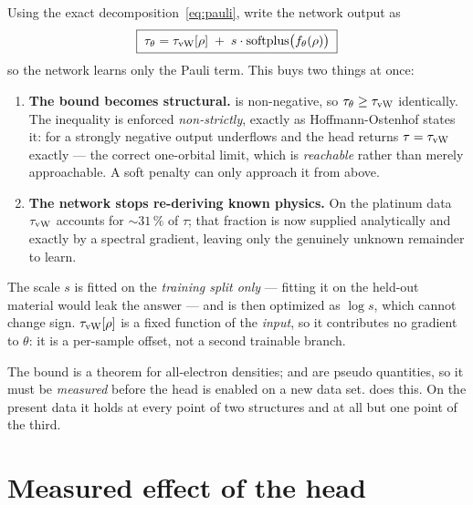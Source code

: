 Using the exact decomposition~\eqref{eq:pauli}, write the network output as
\begin{equation}
  \boxed{\;
    \tau_\theta = \tau_{\mathrm{vW}}[\rho] \;+\; s\cdot\mathrm{softplus}\bigl(f_\theta(\rho)\bigr) \;}
  \label{eq:paulihead}
\end{equation}
so the network learns only the Pauli term. This buys two things at once:

\begin{enumerate}
  \item \textbf{The bound becomes structural.}  is non-negative,
    so $\tau_\theta \ge \tau_{\mathrm{vW}}$ identically. The inequality is enforced
    \emph{non-strictly}, exactly as Hoffmann-Ostenhof states it: for a strongly
    negative output  underflows and the head returns
    $\tau=\tau_{\mathrm{vW}}$ exactly --- the correct one-orbital limit, which is
    \emph{reachable} rather than merely approachable. A soft penalty can only
    approach it from above.
  \item \textbf{The network stops re-deriving known physics.} On the platinum data
    $\tau_{\mathrm{vW}}$ accounts for $\sim31\,\%$ of $\tau$; that fraction is now supplied
    analytically and exactly by a spectral gradient, leaving only the genuinely
    unknown remainder to learn.
\end{enumerate}

\begin{ptip}
The scale $s$ is fitted on the \emph{training split only} --- fitting it on the
held-out material would leak the answer --- and is then optimized as $\log s$,
which cannot change sign. $\tau_{\mathrm{vW}}[\rho]$ is a fixed function of the
\emph{input}, so it contributes no gradient to $\theta$: it is a per-sample
offset, not a second trainable branch.
\end{ptip}

\begin{pwarn}
The bound is a theorem for all-electron densities;  and
 are pseudo quantities, so it must be \emph{measured} before the
head is enabled on a new data set.  does this.
On the present data it holds at every point of two structures and at all but
one point of the third.
\end{pwarn}

\section{Measured effect of the head}
\label{sec:headresult}

